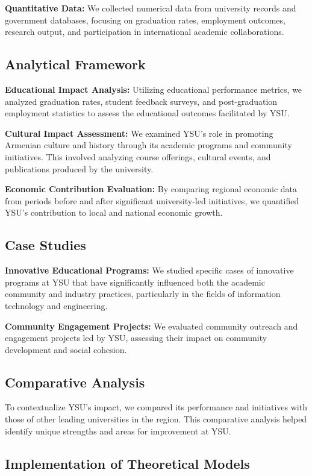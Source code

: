 \documentclass[12pt,onecolumn]{article}
\begin{document}
\textbf{Quantitative Data:} We collected numerical data from university records and government databases, focusing on graduation rates, employment outcomes, research output, and participation in international academic collaborations.

\subsection{Analytical Framework}

\textbf{Educational Impact Analysis:} Utilizing educational performance metrics, we analyzed graduation rates, student feedback surveys, and post-graduation employment statistics to assess the educational outcomes facilitated by YSU.

\textbf{Cultural Impact Assessment:} We examined YSU's role in promoting Armenian culture and history through its academic programs and community initiatives. This involved analyzing course offerings, cultural events, and publications produced by the university.

\textbf{Economic Contribution Evaluation:} By comparing regional economic data from periods before and after significant university-led initiatives, we quantified YSU's contribution to local and national economic growth.

\subsection{Case Studies}

\textbf{Innovative Educational Programs:} We studied specific cases of innovative programs at YSU that have significantly influenced both the academic community and industry practices, particularly in the fields of information technology and engineering.

\textbf{Community Engagement Projects:} We evaluated community outreach and engagement projects led by YSU, assessing their impact on community development and social cohesion.

\subsection{Comparative Analysis}

To contextualize YSU's impact, we compared its performance and initiatives with those of other leading universities in the region. This comparative analysis helped identify unique strengths and areas for improvement at YSU.

\subsection{Implementation of Theoretical Models}
\end{document}

